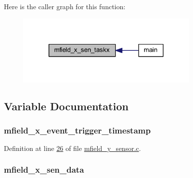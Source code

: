 Here is the caller graph for this function\+:\nopagebreak
\begin{figure}[H]
\begin{center}
\leavevmode
\includegraphics[width=257pt]{d1/d84/a00052_a72e9235043dc4a8469143a6eb48bf117_icgraph}
\end{center}
\end{figure}




\subsection{Variable Documentation}
\hypertarget{a00052_acb61c9078ac98b44c42bf119521b18b0}{
\subsubsection[{mfield\+\_\+x\+\_\+event\+\_\+trigger\+\_\+timestamp}]{ mfield\+\_\+x\+\_\+event\+\_\+trigger\+\_\+timestamp}}\label{a00052_acb61c9078ac98b44c42bf119521b18b0}


Definition at line \hyperlink{a00052_source_l00026}{26} of file \hyperlink{a00052_source}{mfield\+\_\+y\+\_\+sensor.\+c}.

\hypertarget{a00052_af8c531b1ba5fea148fb9111e06058f92}{
\subsubsection[{mfield\+\_\+x\+\_\+sen\+\_\+data}]{ mfield\+\_\+x\+\_\+sen\+\_\+data}}\label{a00052_af8c531b1ba5fea148fb9111e06058f92}


